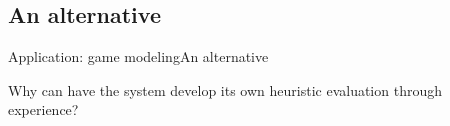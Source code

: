 \subsection{An alternative}
\begin{frame}{Application: game modeling}{An alternative}

Why can have the system develop its own heuristic evaluation through experience?

\end{frame}